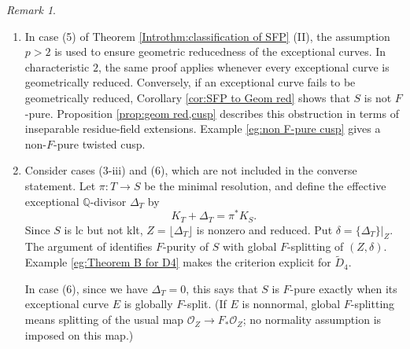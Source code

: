 \documentclass[12pt]{amsart}
\newcommand{\Q}{\mathbb{Q}}
\newcommand{\sO}{\mathcal{O}}
\theoremstyle{plain}
\theoremstyle{definition}
\theoremstyle{remark}
\newtheorem{rem}[thm]{Remark}
\newtheorem{defn and notation}[thm]{Definition and Notation}
\theoremstyle{plain}
\numberwithin{equation}{thm}
\begin{document}
\begin{rem}\label{rem:Remark on Theorem B}
\
\begin{enumerate}[label=\textup{(\arabic*)}]
\item In case (5) of Theorem \ref{Introthm:classification of SFP} (II), the assumption $p>2$ is used to ensure geometric reducedness of the exceptional curves.
In characteristic $2$, the same proof applies whenever every exceptional curve is geometrically reduced.
Conversely, if an exceptional curve fails to be geometrically reduced, Corollary \ref{cor:SFP to Geom red} shows that $S$ is not $F$-pure.
Proposition \ref{prop:geom red,cusp} describes this obstruction in terms of inseparable residue-field extensions.
Example \ref{eg:non F-pure cusp} gives a non-$F$-pure twisted cusp.

\item Consider cases (3-iii) and (6), which are not included in the converse statement.
Let $\pi\colon T\to S$ be the minimal resolution, and define the effective exceptional $\Q$-divisor $\Delta_T$ by
\[
K_T+\Delta_T=\pi^*K_S.
\]
Since $S$ is lc but not klt, $Z=\lfloor\Delta_T\rfloor$ is nonzero and reduced.
Put $\delta=\{\Delta_T\}|_Z$.
The argument of \cite[Proposition 4.7]{Hara(two-dim)} identifies $F$-purity of $S$ with global $F$-splitting of $(Z,\delta)$.
Example \ref{eg:Theorem B for D4} makes the criterion explicit for $\widetilde D_4$.

In case (6), since we have $\Delta_T=0$, this says that $S$ is $F$-pure exactly when its exceptional curve $E$ is globally $F$-split.
(If $E$ is nonnormal, global $F$-splitting means splitting of the usual map $\sO_Z\to F_*\sO_Z$; no normality assumption is imposed on this map.)
\end{enumerate}
\end{rem}
\end{document}

